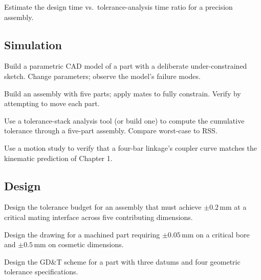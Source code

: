 \begin{exercise}
Estimate the design time vs.\ tolerance-analysis time ratio for a precision assembly.
\end{exercise}

\subsection*{Simulation}

\begin{exercise}
Build a parametric CAD model of a part with a deliberate under-constrained sketch. Change parameters; observe the model's failure modes.
\end{exercise}

\begin{exercise}
Build an assembly with five parts; apply mates to fully constrain. Verify by attempting to move each part.
\end{exercise}

\begin{exercise}
Use a tolerance-stack analysis tool (or build one) to compute the cumulative tolerance through a five-part assembly. Compare worst-case to RSS.
\end{exercise}

\begin{exercise}
Use a motion study to verify that a four-bar linkage's coupler curve matches the kinematic prediction of Chapter 1.
\end{exercise}

\subsection*{Design}

\begin{exercise}
Design the tolerance budget for an assembly that must achieve $\pm 0.2\,\si{\milli\meter}$ at a critical mating interface across five contributing dimensions.
\end{exercise}

\begin{exercise}
Design the drawing for a machined part requiring $\pm 0.05\,\si{\milli\meter}$ on a critical bore and $\pm 0.5\,\si{\milli\meter}$ on cosmetic dimensions.
\end{exercise}

\begin{exercise}
Design the GD\&T scheme for a part with three datums and four geometric tolerance specifications.
\end{exercise}

